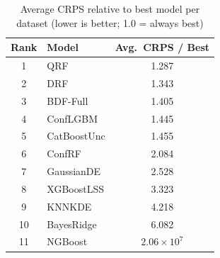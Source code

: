 \begin{table}[htbp]
\centering
\caption{Average CRPS relative to best model per dataset (lower is better; 1.0 = always best)}
\label{tab:rel-to-best-crps}
\begin{tabular}{clc}
\toprule
Rank & Model & Avg.\ CRPS / Best \\
\midrule
1 & QRF & 1.287 \\
2 & DRF & 1.343 \\
3 & BDF-Full & 1.405 \\
4 & ConfLGBM & 1.445 \\
5 & CatBoostUnc & 1.455 \\
6 & ConfRF & 2.084 \\
7 & GaussianDE & 2.528 \\
8 & XGBoostLSS & 3.323 \\
9 & KNNKDE & 4.218 \\
10 & BayesRidge & 6.082 \\
11 & NGBoost & $2.06\times10^{7}$ \\
\bottomrule
\end{tabular}
\end{table}
